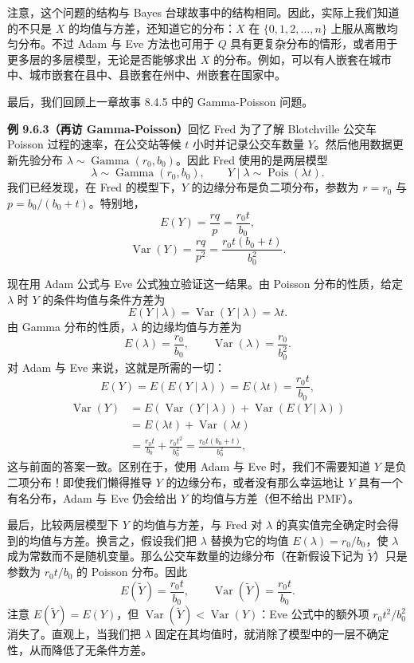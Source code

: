 \documentclass[UTF8, 12pt, fontset=fandol, oneside]{ctexart}
\begin{document}
注意，这个问题的结构与 Bayes 台球故事中的结构相同。因此，实际上我们知道的不只是 $X$ 的均值与方差，还知道它的分布：$X$ 在 $\{0,1,2,\ldots,n\}$ 上服从离散均匀分布。不过 Adam 与 Eve 方法也可用于 $Q$ 具有更复杂分布的情形，或者用于更多层的多层模型，无论是否能够求出 $X$ 的分布。例如，可以有人嵌套在城市中、城市嵌套在县中、县嵌套在州中、州嵌套在国家中。

最后，我们回顾上一章故事 8.4.5 中的 Gamma-Poisson 问题。

\noindent\textbf{例 9.6.3（再访 Gamma-Poisson）}\quad 回忆 Fred 为了了解 Blotchville 公交车 Poisson 过程的速率，在公交站等候 $t$ 小时并记录公交车数量 $Y$。然后他用数据更新先验分布 $\lambda\sim\operatorname{Gamma}(r_0,b_0)$。因此 Fred 使用的是两层模型
\[
  \lambda\sim\operatorname{Gamma}(r_0,b_0),\qquad
  Y\mid \lambda\sim\operatorname{Pois}(\lambda t).
\]
我们已经发现，在 Fred 的模型下，$Y$ 的边缘分布是负二项分布，参数为 $r=r_0$ 与 $p=b_0/(b_0+t)$。特别地，
\[
  E(Y)=\frac{rq}{p}=\frac{r_0t}{b_0},
\]
\[
  \operatorname{Var}(Y)=\frac{rq}{p^2}
  =\frac{r_0t(b_0+t)}{b_0^2}.
\]

现在用 Adam 公式与 Eve 公式独立验证这一结果。由 Poisson 分布的性质，给定 $\lambda$ 时 $Y$ 的条件均值与条件方差为
\[
  E(Y\mid \lambda)=\operatorname{Var}(Y\mid \lambda)=\lambda t.
\]
由 Gamma 分布的性质，$\lambda$ 的边缘均值与方差为
\[
  E(\lambda)=\frac{r_0}{b_0},\qquad \operatorname{Var}(\lambda)=\frac{r_0}{b_0^2}.
\]
对 Adam 与 Eve 来说，这就是所需的一切：
\[
  E(Y)=E(E(Y\mid \lambda))=E(\lambda t)=\frac{r_0t}{b_0},
\]
\[
\begin{aligned}
  \operatorname{Var}(Y)
  &=E(\operatorname{Var}(Y\mid \lambda))+\operatorname{Var}(E(Y\mid \lambda))\\
  &=E(\lambda t)+\operatorname{Var}(\lambda t)\\
  &=\frac{r_0t}{b_0}+\frac{r_0t^2}{b_0^2}
  =\frac{r_0t(b_0+t)}{b_0^2},
\end{aligned}
\]
这与前面的答案一致。区别在于，使用 Adam 与 Eve 时，我们不需要知道 $Y$ 是负二项分布！即使我们懒得推导 $Y$ 的边缘分布，或者没有那么幸运地让 $Y$ 具有一个有名分布，Adam 与 Eve 仍会给出 $Y$ 的均值与方差（但不给出 PMF）。

最后，比较两层模型下 $Y$ 的均值与方差，与 Fred 对 $\lambda$ 的真实值完全确定时会得到的均值与方差。换言之，假设我们把 $\lambda$ 替换为它的均值 $E(\lambda)=r_0/b_0$，使 $\lambda$ 成为常数而不是随机变量。那么公交车数量的边缘分布（在新假设下记为 $\tilde Y$）只是参数为 $r_0t/b_0$ 的 Poisson 分布。因此
\[
  E(\tilde Y)=\frac{r_0t}{b_0},\qquad
  \operatorname{Var}(\tilde Y)=\frac{r_0t}{b_0}.
\]
注意 $E(\tilde Y)=E(Y)$，但 $\operatorname{Var}(\tilde Y)<\operatorname{Var}(Y)$：Eve 公式中的额外项 $r_0t^2/b_0^2$ 消失了。直观上，当我们把 $\lambda$ 固定在其均值时，就消除了模型中的一层不确定性，从而降低了无条件方差。
\end{document}
